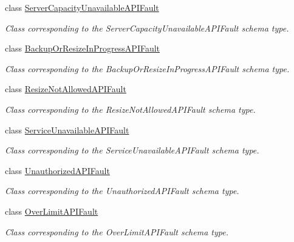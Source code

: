 \begin{DoxyCompactItemize}
class \hyperlink{classopenstack_1_1xml_1_1ServerCapacityUnavailableAPIFault}{ServerCapacityUnavailableAPIFault}
\begin{DoxyCompactList}\small\item\em Class corresponding to the ServerCapacityUnavailableAPIFault schema type. \item\end{DoxyCompactList}\item 
class \hyperlink{classopenstack_1_1xml_1_1BackupOrResizeInProgressAPIFault}{BackupOrResizeInProgressAPIFault}
\begin{DoxyCompactList}\small\item\em Class corresponding to the BackupOrResizeInProgressAPIFault schema type. \item\end{DoxyCompactList}\item 
class \hyperlink{classopenstack_1_1xml_1_1ResizeNotAllowedAPIFault}{ResizeNotAllowedAPIFault}
\begin{DoxyCompactList}\small\item\em Class corresponding to the ResizeNotAllowedAPIFault schema type. \item\end{DoxyCompactList}\item 
class \hyperlink{classopenstack_1_1xml_1_1ServiceUnavailableAPIFault}{ServiceUnavailableAPIFault}
\begin{DoxyCompactList}\small\item\em Class corresponding to the ServiceUnavailableAPIFault schema type. \item\end{DoxyCompactList}\item 
class \hyperlink{classopenstack_1_1xml_1_1UnauthorizedAPIFault}{UnauthorizedAPIFault}
\begin{DoxyCompactList}\small\item\em Class corresponding to the UnauthorizedAPIFault schema type. \item\end{DoxyCompactList}\item 
class \hyperlink{classopenstack_1_1xml_1_1OverLimitAPIFault}{OverLimitAPIFault}
\begin{DoxyCompactList}\small\item\em Class corresponding to the OverLimitAPIFault schema type. \item\end{DoxyCompactList}\item 

\end{DoxyCompactItemize}

